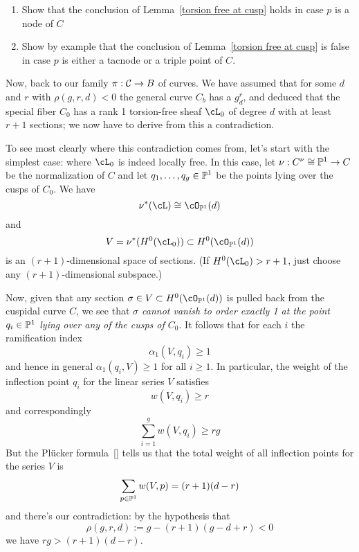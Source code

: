 \begin{exercise}
\begin{enumerate}
\item Show  that the conclusion of Lemma~\ref{torsion free at cusp} holds in case $p$ is a node of $C$
\item Show by example that the conclusion of Lemma~\ref{torsion free at cusp} is false in case $p$ is either a tacnode or a triple point of $C$.
\end{enumerate}
\end{exercise}



Now, back to our family $\pi : \cC \to B$ of curves. We have assumed that for some $d$ and $r$ with $\rho(g,r,d) < 0$ the general curve $C_b$ has a $g^r_d$, and deduced that the special fiber $C_0$ has a rank 1 torsion-free sheaf $\cL_0$ of degree $d$ with at least $r+1$ sections; we now have to derive from this a contradiction.

To see most clearly where this contradiction comes from, let's start with the simplest case: where $\cL_0$ is indeed locally free. In this case, let $\nu :  C^\nu \cong \PP^1 \to C$ be the normalization of $C$ and let $q_1,\dots, q_g \in \PP^1$ be the points lying over the cusps of $C_0$. We have
$$
\nu^*(\cL) \cong \cO_{\PP^1}(d)
$$  
and 
$$
V = \nu^*(H^0(\cL_0)) \subset H^0(\cO_{\PP^1}(d))
$$
is an $(r+1)$-dimensional space of sections. (If $H^0(\cL_0) > r+1$, just choose any $(r+1)$-dimensional subspace.) 

Now, given that any section $\sigma \in V \subset H^0(\cO_{\PP^1}(d))$ is pulled back from the cuspidal curve $C$, we see that \emph{$\sigma$ cannot vanish to order exactly 1 at the point $q_i \in \PP^1$ lying over any of the cusps of $C_0$}. It follows that for each $i$ the ramification index 
$$
\alpha_1(V,q_i) \geq 1 
$$
and hence in  general $\alpha_1(q_i,V) \geq 1$ for all $i \geq 1$. In particular, the weight of the inflection point $q_i$ for the linear series $V$ satisfies
$$
w(V, q_i) \geq r
$$
and correspondingly
$$
\sum_{i=1}^g w(V, q_i) \geq rg
$$
But the Pl\"ucker formula~\ref{} tells us that the total weight of all inflection points for the series $V$ is
$$
\sum_{p \in \PP^1} w(V,p) = (r+1)(d-r)
$$
and there's our contradiction: by the hypothesis that 
$$
\rho(g,r,d) := g - (r+1)(g-d+r) < 0
$$
we have $rg > (r+1)(d-r)$.

